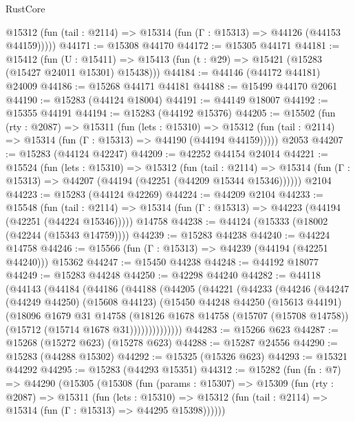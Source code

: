 \begin{lexlean}{RustCore}
\begin{coremodule}
      @15312 (fun (tail : @2114) => @15314 (fun (Γ : @15313) => @44126 (@44153 @44159)))))
@44171 := @15308 @44170
@44172 := @15305 @44171
@44181 := @15412
    (fun (U : @15411) => @15413 (fun (t : @29) => @15421 (@15283 (@15427 @24011 @15301) @15438)))
@44184 := @44146 (@44172 @44181) @24009
@44186 := @15268 @44171 @44181
@44188 := @15499 @44170 @2061
@44190 := @15283 (@44124 @18004)
@44191 := @44149 @18007
@44192 := @15355 @44191
@44194 := @15283 (@44192 @15376)
@44205 := @15502
    (fun (rty : @2087) =>
    @15311
      (fun (lets : @15310) =>
      @15312 (fun (tail : @2114) => @15314 (fun (Γ : @15313) => @44190 (@44194 @44159)))))
    @2053
@44207 := @15283 (@44124 @42247)
@44209 := @42252 @44154 @24014
@44221 := @15524
    (fun (lets : @15310) =>
    @15312
      (fun (tail : @2114) =>
      @15314 (fun (Γ : @15313) => @44207 (@44194 (@42251 (@44209 @15344 @15346))))))
    @2104
@44223 := @15283 (@44124 @42269)
@44224 := @44209 @2104
@44233 := @15548
    (fun (tail : @2114) => @15314 (fun (Γ : @15313) => @44223 (@44194 (@42251 (@44224 @15346)))))
    @14758
@44238 := @44124 (@15333 (@18002 (@42244 (@15343 @14759))))
@44239 := @15283 @44238
@44240 := @44224 @14758
@44246 := @15566 (fun (Γ : @15313) => @44239 (@44194 (@42251 @44240))) @15362
@44247 := @15450 @44238
@44248 := @44192 @18077
@44249 := @15283 @44248
@44250 := @42298 @44240
@44282 := @44118
    (@44143
      (@44184
        (@44186
          (@44188
            (@44205
              (@44221
                (@44233
                  (@44246
                    (@44247
                      (@44249 @44250)
                      (@15608 @44123)
                      (@15450
                        @44248
                        @44250
                        (@15613 @44191)
                        (@18096
                          @1679
                          @31
                          @14758
                          (@18126
                            @1678
                            @14758
                            (@15707 (@15708 @14758))
                            (@15712 (@15714 @1678 @31))))))))))))))
@44283 := @15266 @623
@44287 := @15268 (@15272 @623) (@15278 @623)
@44288 := @15287 @24556
@44290 := @15283 (@44288 @15302)
@44292 := @15325 (@15326 @623)
@44293 := @15321 @44292
@44295 := @15283 (@44293 @15351)
@44312 := @15282
    (fun (fn : @7) =>
    @44290
      (@15305
        (@15308
          (fun (params : @15307) =>
          @15309
            (fun (rty : @2087) =>
            @15311
              (fun (lets : @15310) =>
              @15312 (fun (tail : @2114) => @15314 (fun (Γ : @15313) => @44295 @15398))))))

\end{coremodule}
\end{lexlean}
